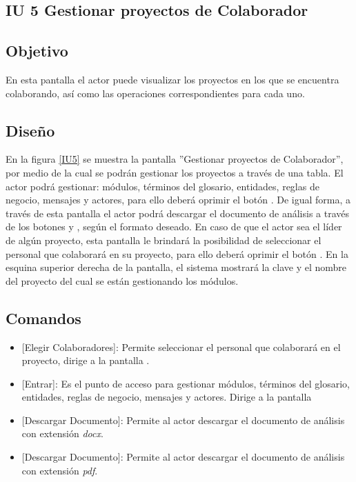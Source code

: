 \subsection{IU 5 Gestionar proyectos de Colaborador}

\subsection{Objetivo}
	En esta pantalla el actor puede visualizar los proyectos en los que se encuentra colaborando, así como las operaciones correspondientes para cada uno.
\subsection{Diseño}
	En la figura \ref{IU5} se muestra la pantalla ''Gestionar proyectos de Colaborador'', por medio de la cual se podrán gestionar los proyectos a través de una tabla. El actor podrá gestionar: módulos, términos del glosario, entidades, reglas de negocio, mensajes y actores, para ello deberá oprimir el botón . De igual forma, a través de esta pantalla el actor podrá descargar el documento de análisis a través de los botones 
	 y , según el formato deseado. En caso de que el actor sea el líder de algún proyecto,	esta pantalla le brindará la posibilidad de seleccionar el personal que colaborará en su proyecto, para ello deberá oprimir el botón .
	En la esquina superior derecha de la pantalla, el sistema mostrará la clave y el nombre del proyecto del cual se están gestionando los módulos.

\label{IU5}
\subsection{Comandos}
\begin{itemize}
	\item {} [Elegir Colaboradores]: Permite seleccionar el personal que colaborará en el proyecto, dirige a la pantalla .
	\item {} [Entrar]: Es el punto de acceso para gestionar módulos, términos del glosario, entidades, reglas de negocio, mensajes y actores. Dirige a la pantalla 
	\item {} [Descargar Documento]: Permite al actor descargar el documento de análisis con extensión {\em docx}.
	\item {} [Descargar Documento]: Permite al actor descargar el documento de análisis con extensión {\em pdf}.
\end{itemize}
